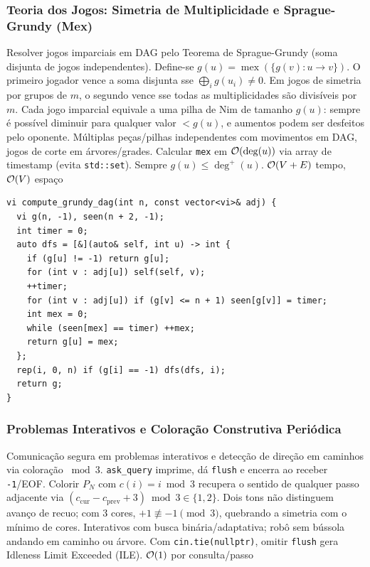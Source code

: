 \subsubsection{Teoria dos Jogos: Simetria de Multiplicidade e Sprague-Grundy (Mex)}
\algobox
  {Resolver jogos imparciais em DAG pelo Teorema de Sprague-Grundy (soma disjunta de jogos independentes).}
  {Define-se $g(u) = \operatorname{mex}(\{g(v) : u \to v\})$. O primeiro jogador vence a soma disjunta sse $\bigoplus_i g(u_i) \neq 0$. Em jogos de simetria por grupos de $m$, o segundo vence sse todas as multiplicidades são divisíveis por $m$.}
  {Cada jogo imparcial equivale a uma pilha de Nim de tamanho $g(u)$: sempre é possível diminuir para qualquer valor $< g(u)$, e aumentos podem ser desfeitos pelo oponente.}
  {Múltiplas peças/pilhas independentes com movimentos em DAG, jogos de corte em árvores/grades.}
  {Calcular \texttt{mex} em $\mathcal{O}(\deg(u))$ via array de timestamp (evita \texttt{std::set}). Sempre $g(u) \le \deg^+(u)$.}
  {$\mathcal{O}(V + E)$ tempo, $\mathcal{O}(V)$ espaço}

\begin{lstlisting}
vi compute_grundy_dag(int n, const vector<vi>& adj) {
  vi g(n, -1), seen(n + 2, -1);
  int timer = 0;
  auto dfs = [&](auto& self, int u) -> int {
    if (g[u] != -1) return g[u];
    for (int v : adj[u]) self(self, v);
    ++timer;
    for (int v : adj[u]) if (g[v] <= n + 1) seen[g[v]] = timer;
    int mex = 0;
    while (seen[mex] == timer) ++mex;
    return g[u] = mex;
  };
  rep(i, 0, n) if (g[i] == -1) dfs(dfs, i);
  return g;
}
\end{lstlisting}

\subsubsection{Problemas Interativos e Coloração Construtiva Periódica}
\algobox
  {Comunicação segura em problemas interativos e detecção de direção em caminhos via coloração $\bmod 3$.}
  {\texttt{ask\_query} imprime, dá \texttt{flush} e encerra ao receber \texttt{-1}/EOF. Colorir $P_N$ com $c(i) = i \bmod 3$ recupera o sentido de qualquer passo adjacente via $(c_{\text{cur}} - c_{\text{prev}} + 3) \bmod 3 \in \{1, 2\}$.}
  {Dois tons não distinguem avanço de recuo; com $3$ cores, $+1 \not\equiv -1 \pmod 3$, quebrando a simetria com o mínimo de cores.}
  {Interativos com busca binária/adaptativa; robô sem bússola andando em caminho ou árvore.}
  {Com \texttt{cin.tie(nullptr)}, omitir \texttt{flush} gera Idleness Limit Exceeded (ILE).}
  {$\mathcal{O}(1)$ por consulta/passo}

